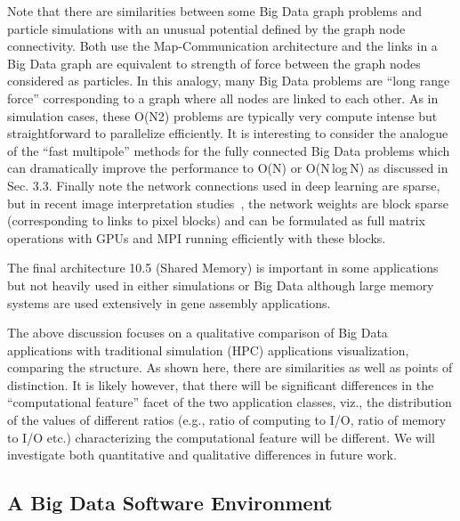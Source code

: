 \documentclass{acm_proc_article-sp}
\begin{document}
Note that there are similarities between some Big Data graph problems and particle simulations with an unusual potential defined by the graph node connectivity. Both use the Map-Communication architecture and the links in a Big Data graph are equivalent to strength of force between the graph nodes considered as particles. In this analogy, many Big Data problems are ``long range force'' corresponding to a graph where all nodes are linked to each other. As in simulation cases, these O(N2) problems are typically very compute intense but straightforward to parallelize efficiently. It is interesting to consider the analogue of the ``fast multipole'' methods for the fully connected Big Data problems which can dramatically improve the performance to O(N) or O(N\,log\,N) as discussed in Sec. 3.3. Finally note the network connections used in deep learning are sparse, but in recent image interpretation studies~\cite{b7}, the network weights are block sparse (corresponding to links to pixel blocks) and can be formulated as full matrix operations with GPUs and MPI running efficiently with these blocks.

The final architecture 10.5 (Shared Memory) is important in some applications but not heavily used in either simulations or Big Data although large memory systems are used extensively in gene assembly applications.

The above discussion focuses on a qualitative comparison of Big Data applications with traditional simulation (HPC) applications visualization, comparing the structure. As shown here, there are similarities as well as points of distinction. It is likely however, that there will be significant differences in the ``computational feature'' facet of the two application classes, viz., the distribution of the values of different ratios (e.g., ratio of computing to I/O, ratio of memory to I/O etc.) characterizing the computational feature will be different. We will investigate both quantitative and qualitative differences in future work.


\subsection{A Big Data Software Environment}

\end{document}
